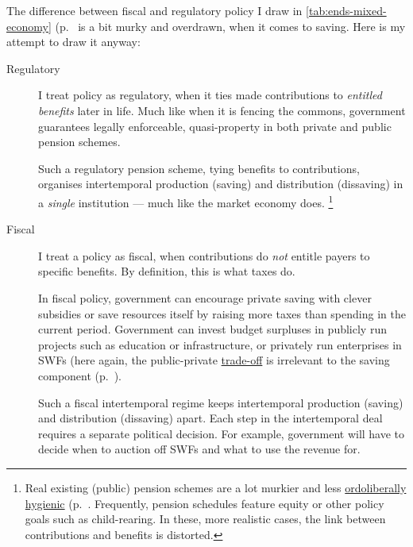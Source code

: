 The difference between fiscal and regulatory policy I draw in \autoref{tab:ends-mixed-economy} (p.~\pageref{tab:ends-mixed-economy} is a bit murky and overdrawn, when it comes to saving.
 Here is my attempt to draw it anyway:
\begin{description}
	\item[Regulatory] I treat policy as regulatory, when it ties made contributions to \emph{entitled benefits} later in life.
	Much like when it is fencing the commons, government guarantees legally enforceable, quasi-property in both private and public pension schemes.

	Such a regulatory pension scheme, tying benefits to contributions, organises intertemporal production (saving) and distribution (dissaving) in a \emph{single} institution --- much like the market economy does.
	\footnote{
		Real existing (public) pension schemes are a lot murkier and less \hyperref[sec:ordoliberal-hygiene]{ordoliberally hygienic} (p.~\pageref{sec:ordoliberal-hygiene}.
		Frequently, pension schedules feature equity or other policy goals such as child-rearing.
		In these, more realistic cases, the link between contributions and benefits is distorted.
	}
	\item[Fiscal] I treat a policy as fiscal, when contributions do \emph{not} entitle payers to specific benefits.
	By definition, this is what taxes do.

	In fiscal policy, government can encourage private saving with clever subsidies or save resources itself by raising more taxes than spending in the current period.
Government can invest budget surpluses in publicly run projects such as education or infrastructure, or privately run enterprises in \glspl{SWF} (here again, the public-private \hyperref[sec:trade-offs]{trade-off} is irrelevant to the saving component (p.~\pageref{trade-offs}).

	Such a fiscal intertemporal regime keeps intertemporal production (saving) and distribution (dissaving) apart.
Each step in the intertemporal deal requires a separate political decision.
For example, government will have to decide when to auction off \glspl{SWF} and what to use the revenue for.
\end{description}

